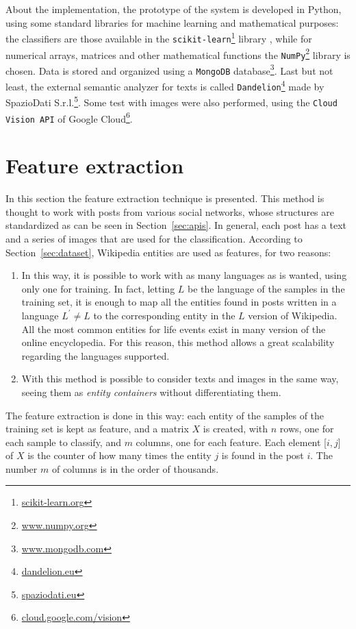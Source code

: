 About the implementation, the prototype of the system is developed in Python, using some standard libraries for machine learning and mathematical purposes: the classifiers are those available in the \texttt{scikit-learn}\footnote{\url{scikit-learn.org}} library \cite{scikit-learn}, while for numerical arrays, matrices and other mathematical functions the \texttt{NumPy}\footnote{\url{www.numpy.org}} library \cite{oliphant2006guide} is chosen. Data is stored and organized using a \texttt{MongoDB} database\footnote{\url{www.mongodb.com}}. Last but not least, the external semantic analyzer for texts is called \texttt{Dandelion}\footnote{\url{dandelion.eu}} made by SpazioDati S.r.l.\footnote{\url{spaziodati.eu}}. Some test with images were also performed, using the \texttt{Cloud Vision API} of Google Cloud\footnote{\url{cloud.google.com/vision}}.

\section{Feature extraction}
\label{sec:featurextraction}
In this section the feature extraction technique is presented. This method is thought to work with posts from various social networks, whose structures are standardized as can be seen in Section~\ref{sec:apis}. In general, each post has a text and a series of images that are used for the classification. According to Section~\ref{sec:dataset}, Wikipedia entities are used as features, for two reasons:
\begin{enumerate}
\item In this way, it is possible to work with as many languages as is wanted, using only one for training. In fact, letting $ L $ be the language of the samples in the training set, it is enough to map all the entities found in posts written in a language $ L^{'} \ne L $ to the corresponding entity in the $ L $ version of Wikipedia. All the most common entities for life events exist in many version of the online encyclopedia. For this reason, this method allows a great scalability regarding the languages supported.
\item With this method is possible to consider texts and images in the same way, seeing them as \emph{entity containers} without differentiating them.
\end{enumerate}

The feature extraction is done in this way: each entity of the samples of the training set is kept as feature, and a matrix $X$ is created, with $n$ rows, one for each sample to classify, and $m$ columns, one for each feature. Each element [$i,j$] of $X$ is the counter of how many times the entity $j$ is found in the post $i$. The number $m$ of columns is in the order of thousands.

